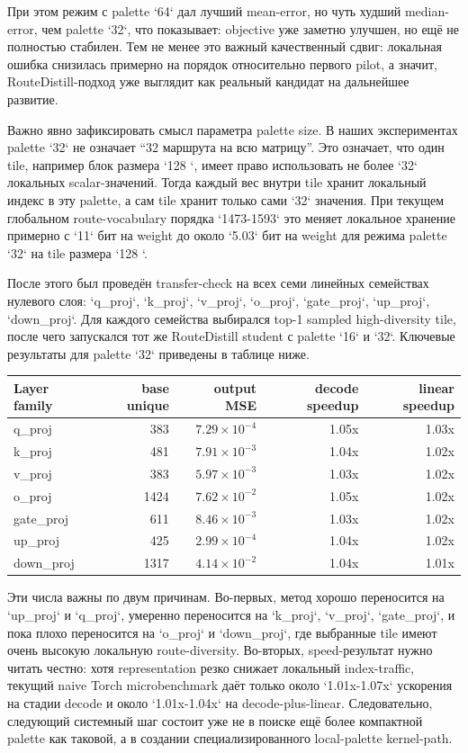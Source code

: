 При этом режим с palette `64` дал лучший mean-error, но чуть худший median-error,
чем palette `32`, что показывает: objective уже заметно улучшен, но ещё не
полностью стабилен. Тем не менее это важный качественный сдвиг: локальная ошибка
снизилась примерно на порядок относительно первого pilot, а значит,
RouteDistill-подход уже выглядит как реальный кандидат на дальнейшее развитие.

Важно явно зафиксировать смысл параметра palette size. В наших экспериментах
palette `32` не означает ``32 маршрута на всю матрицу''. Это означает, что один
tile, например блок размера `128 `, имеет право использовать не более
`32` локальных scalar-значений. Тогда каждый вес внутри tile хранит локальный
индекс в эту palette, а сам tile хранит только сами `32` значения. При текущем
глобальном route-vocabulary порядка `1473-1593` это меняет локальное хранение
примерно с `11` бит на weight до около `5.03` бит на weight для режима palette
`32` на tile размера `128 `.

После этого был проведён transfer-check на всех семи линейных семействах нулевого
слоя: `q_proj`, `k_proj`, `v_proj`, `o_proj`, `gate_proj`, `up_proj`,
`down_proj`. Для каждого семейства выбирался top-1 sampled high-diversity tile,
после чего запускался тот же RouteDistill student с palette `16` и `32`.
Ключевые результаты для palette `32` приведены в таблице ниже.

\begin{center}
\begin{tabular}{lrrrr}
\toprule
Layer family & base unique & output MSE & decode speedup & linear speedup \\
\midrule
q\_proj & 383 & $7.29 \times 10^{-4}$ & 1.05x & 1.03x \\
k\_proj & 481 & $7.91 \times 10^{-3}$ & 1.04x & 1.02x \\
v\_proj & 383 & $5.97 \times 10^{-3}$ & 1.03x & 1.02x \\
o\_proj & 1424 & $7.62 \times 10^{-2}$ & 1.05x & 1.02x \\
gate\_proj & 611 & $8.46 \times 10^{-3}$ & 1.03x & 1.02x \\
up\_proj & 425 & $2.99 \times 10^{-4}$ & 1.04x & 1.02x \\
down\_proj & 1317 & $4.14 \times 10^{-2}$ & 1.04x & 1.01x \\
\bottomrule
\end{tabular}
\end{center}

Эти числа важны по двум причинам. Во-первых, метод хорошо переносится на
`up_proj` и `q_proj`, умеренно переносится на `k_proj`, `v_proj`, `gate_proj`,
и пока плохо переносится на `o_proj` и `down_proj`, где выбранные tile имеют
очень высокую локальную route-diversity. Во-вторых, speed-результат нужно читать
честно: хотя representation резко снижает локальный index-traffic, текущий
naive Torch microbenchmark даёт только около `1.01x-1.07x` ускорения на стадии
decode и около `1.01x-1.04x` на decode-plus-linear. Следовательно, следующий
системный шаг состоит уже не в поиске ещё более компактной palette как таковой,
а в создании специализированного local-palette kernel-path.

